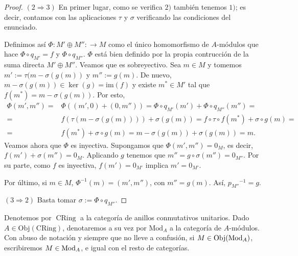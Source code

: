 \documentclass[../main.tex]{subfiles}
\begin{document}
\begin{proof}
	$(2\Rightarrow 3)$ En primer lugar, como se verifica $2)$ también tenemos $1)$; es decir, contamos con las aplicaciones $\tau$ y $\sigma$ verificando las condiciones del enunciado.

	Definimos así $\Phi:M'\oplus M'':\longrightarrow M$ como el único homomorfismo de $A$-módulos que hace $\Phi\circ q_{M'}=f$ y $\Phi\circ q_{M''}$. $\Phi$ está bien definido por la propia contrucción de la suma directa $M'\oplus M''$.
	Veamos que es sobreyectivo. Sea $m\in M$ y tomemos $m':=\tau(m-\sigma(g(m))$ y $m'':=g(m)$. De nuevo, $m-\sigma(g(m))\in\ker(g)=\text{im}(f)$ y existe $m^*\in M'$ tal que $f(m^*)=m-\sigma(g(m))$. Por esto,
	\begin{align*}
	\Phi(m',m'')=&\Phi((m',0)+(0,m''))=\Phi\circ q_{M'}(m')+\Phi\circ q_{M''}(m'')=\\
	=&f(\tau(m-\sigma(g(m))))+\sigma(g(m))=f\circ\tau\circ f(m^*)+\sigma\circ g(m)=\\
	=&f(m^*)+\sigma\circ g(m)=m-\sigma(g(m))+\sigma(g(m))=m.
	\end{align*}
	Veamos ahora que $\Phi$ es inyectiva. Supongamos que $\Phi(m',m'')=0_M$, es decir, $f(m')+\sigma(m'')=0_M$. Aplicando $g$ tenemos que $m''=g\circ\sigma(m'')=0_{M''}$. Por su parte, como $f$ es inyectiva, $f(m')=0_{M'}$ implica $m'=0_{M'}$.

	Por último, si $m\in M$, $\Phi^{-1}(m)=(m',m'')$, con $m''=g(m)$. Así, ${p_{M''}}^{-1}=g$.

	$(3\Rightarrow 2)$ Basta tomar $\sigma:= \Phi\circ q_{M''}$.
\end{proof}

Denotemos por $\operatorname{CRing}$ a la categoría de anillos conmutativos unitarios. Dado $A\in\text{Obj}(\text{CRing})$, denotaremos a su vez por $\text{Mod}_A$ a la categoría de $A$-módulos. Con abuso de notación y siempre que no lleve a confusión, si $M\in\operatorname{Obj}(\operatorname{Mod}_A)$, escribiremos $M\in \operatorname{Mod}_A$, e igual con el resto de categorías.
\end{document}
